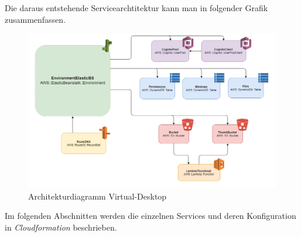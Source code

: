 \documentclass[a4paper, 12pt]{scrreprt}
\renewcommand\_{\textunderscore\allowbreak}
\begin{document}
\newpage
\noindent Die daraus entstehende Servicearchtitektur kann man in folgender Grafik zusammenfassen.

\begin{figure}[H]
\centering
\includegraphics[scale=0.4]{ArchiDiagram.png} 
\caption{Architekturdiagramm Virtual-Desktop}
\end{figure}

\noindent Im folgenden Abschnitten werden die einzelnen Services und deren Konfiguration in \textit{Cloudformation} beschrieben. 
\end{document}
